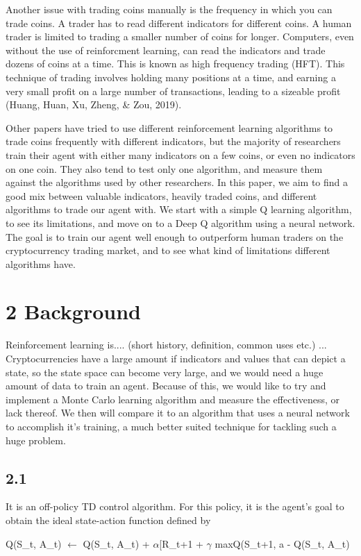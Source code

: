 \documentclass[letterpaper]{article}
\begin{document}
Another issue with trading coins manually is the frequency in which you can trade coins. A trader has to read different indicators for different coins. A human trader is limited to trading a smaller number of coins for longer. Computers, even without the use of reinforcment learning, can read the indicators and trade dozens of coins at a time. This is known as high frequency trading (HFT). This technique of trading involves holding many positions at a time, and earning a very small profit on a large number of transactions, leading to a sizeable profit (Huang, Huan, Xu, Zheng, \& Zou, 2019).

Other papers have tried to use different reinforcement learning algorithms to trade coins frequently with different indicators, but the majority of researchers train their agent with either many indicators on a few coins, or even no indicators on one coin. They also tend to test only one algorithm, and measure them against the algorithms used by other researchers. In this paper, we aim to find a good mix between valuable indicators, heavily traded coins, and different algorithms to trade our agent with. We start with a simple Q learning algorithm, to see its limitations, and move on to a Deep Q algorithm using a neural network. The goal is to train our agent well enough to outperform human traders on the cryptocurrency trading market, and to see what kind of limitations different algorithms have.

\section{2 Background}
Reinforcement learning is.... (short history, definition, common uses etc.)
... Cryptocurrencies have a large amount if indicators and values that can depict a state, so the state space can become very large, and we would need a huge amount of data to train an agent. Because of this, we would like to try and implement a Monte Carlo learning algorithm and measure the effectiveness, or lack thereof. We then will compare it to an algorithm that uses a neural network to accomplish it's training, a much better suited technique for tackling such a huge problem.
\subsection{2.1}
It is an off-policy TD control algorithm. For this policy, it is the agent's goal to obtain the ideal state-action function defined by

Q(S\_{t}, A\_{t}) $\leftarrow$ Q(S\_{t}, A\_{t}) + $\alpha$[R\_{t+1} + $\gamma$ maxQ(S\_{t+1, a} - Q(S\_{t}, A\_{t})
	
\end{document}
